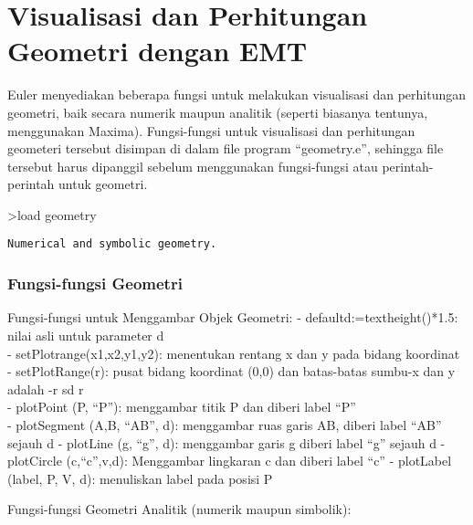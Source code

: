 \documentclass[
]{book}
\author{}
\date{}
\begin{document}
\frontmatter

\mainmatter
\chapter{Visualisasi dan Perhitungan Geometri dengan EMT}\label{visualisasi-dan-perhitungan-geometri-dengan-emt}

Euler menyediakan beberapa fungsi untuk melakukan visualisasi dan perhitungan geometri, baik secara numerik maupun analitik (seperti biasanya tentunya, menggunakan Maxima). Fungsi-fungsi untuk visualisasi dan perhitungan geometeri tersebut disimpan di dalam file program ``geometry.e'', sehingga file tersebut harus dipanggil sebelum menggunakan fungsi-fungsi atau perintah-perintah untuk geometri.

\textgreater load geometry

\begin{verbatim}
Numerical and symbolic geometry.
\end{verbatim}

\subsection{Fungsi-fungsi Geometri}\label{fungsi-fungsi-geometri}

Fungsi-fungsi untuk Menggambar Objek Geometri: - defaultd:=textheight()*1.5: nilai asli untuk parameter d\\
- setPlotrange(x1,x2,y1,y2): menentukan rentang x dan y pada bidang koordinat\\
- setPlotRange(r): pusat bidang koordinat (0,0) dan batas-batas sumbu-x dan y adalah -r sd r\\
- plotPoint (P, ``P''): menggambar titik P dan diberi label ``P''\\
- plotSegment (A,B, ``AB'', d): menggambar ruas garis AB, diberi label ``AB'' sejauh d - plotLine (g, ``g'', d): menggambar garis g diberi label ``g'' sejauh d - plotCircle (c,``c'',v,d): Menggambar lingkaran c dan diberi label ``c'' - plotLabel (label, P, V, d): menuliskan label pada posisi P

Fungsi-fungsi Geometri Analitik (numerik maupun simbolik):
\end{document}
